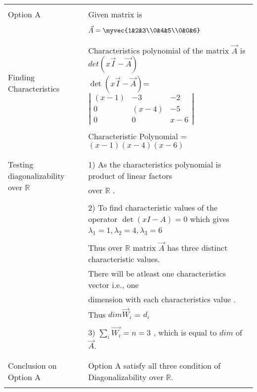 \begin{longtable}{|l|l|}
\hline
\multirow{3}{*}{Option A} & \\
& Given matrix is  \\
&\\
& $\vec{A}=\myvec{1&2&3\\0&4&5\\0&0&6}$\\
&\\
\hline
\multirow{3}{*}{Finding Characteristics} & \\
&
Characteristics polynomial of the matrix $\vec{A}$ is $det(x\vec{I}-\vec{A})$\\ 
polynomial
& $\det(x\vec{I}-\vec{A})$= $\left|
                \begin{array}{ccc}
                (x-1) & -3 & -2\\
                0 & (x-4) & -5\\
                0 & 0 & x-6
                \end{array} \right|$  \\
&\\
& Characteristic Polynomial = $(x-1)(x-4)(x-6)$\\
&\\
\hline
\multirow{3}{*}{Testing diagonalizability over $\mathbb{R}$} & \\
& 1) As the characteristics  polynomial is product of linear factors\\
&over $\mathbb{R}$ .\\
&\\
&2) To find characteristic values of the operator $\det(xI-A) = 0$ which gives  \\
& $\lambda_1= 1 , \lambda_2= 4, \lambda_3= 6$\\
&\\
& Thus over $\mathbb{R}$ matrix $\vec{A}$ has three distinct characteristic values.\\
&There will be atleast one characteristics vector i.e., one\\ & dimension with each characteristics value .\\
&Thus $dim \vec{W}_i$ = $d_i$\\
&\\
&3) $\sum_{i} \vec{W_i} = n = 3$ , which is equal to $dim$ of $\vec{A}$.\\ 
&\\
\hline
\multirow{3}{*}{Conclusion on Option A} & \\
& Option A satisfy all three condition of Diagonalizability over $\mathbb{R}$. \\
&\\


\end{longtable}
